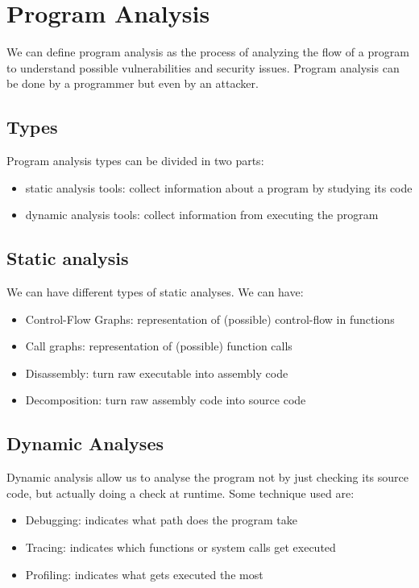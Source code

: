 \section{Program Analysis}

We can define program analysis as the process of analyzing the flow of a program to understand possible vulnerabilities and security issues. Program analysis can be done by a programmer but even by an attacker. 

\subsection{Types}
Program analysis types can be divided in two parts: 

\begin{itemize}
    \item static analysis tools: collect information about a program by studying its code
    \item dynamic analysis tools: collect information from executing the program
\end{itemize}

\subsection{Static analysis} 
We can have different types of static analyses. We can have: 
\begin{itemize}
    \item Control-Flow Graphs: representation of (possible) control-flow in functions
    \item Call graphs: representation of (possible) function calls 
    \item Disassembly: turn raw executable into assembly code
    \item Decomposition: turn raw assembly code into source code
\end{itemize}

\subsection{Dynamic Analyses}
Dynamic analysis allow us to analyse the program not by just checking its source code, but actually doing a check at runtime. 
Some technique used are: 
\begin{itemize}
    \item Debugging: indicates what path does the program take
    \item Tracing: indicates which functions or system calls get executed
    \item Profiling: indicates what gets executed the most
\end{itemize}


